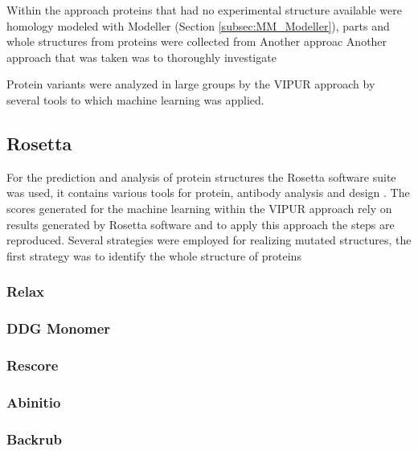 Within the approach proteins that had no experimental structure available were homology modeled with Modeller (Section \ref{subsec:MM_Modeller}), parts and whole structures from proteins were collected from 
Another approac
Another approach that was taken was to thoroughly investigate 

Protein variants were analyzed in large groups by the VIPUR approach by several tools to which machine learning was applied. 

\subsection{Rosetta}
For the prediction and analysis of protein structures the Rosetta software suite was used, it contains various tools for protein, antibody analysis and design \cite{}.
The scores generated for the machine learning within the VIPUR approach rely on results generated by Rosetta software and to apply this approach the steps are reproduced.  
Several strategies were employed for realizing mutated structures, the first strategy was to identify the whole structure of proteins



\subsubsection{Relax}
\label{subsubsec:MM_Relax}

\subsubsection{DDG Monomer}
\label{subsubsec:MM_DDG_Monomer}

\subsubsection{Rescore}
\label{subsubsec:MM_Rescore}

\subsubsection{Abinitio}
\label{subsubsec:MM_Abinitio}

\subsubsection{Backrub}
\label{subsubsec:MM_Backrub}

\label{subsec:MM_Rosetta}

